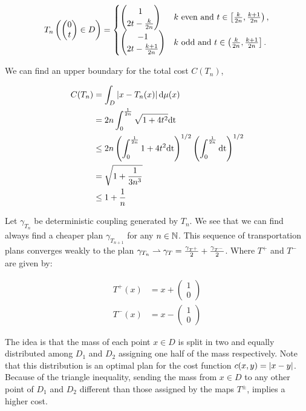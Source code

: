 \begin{equation*}
T_n\left( \begin{pmatrix}0\\t\end{pmatrix}\in D \right)=\begin{cases}
\begin{pmatrix}1\\  2t - \frac{k}{2n}\end{pmatrix} & k \text{ even } \mathrm{and} \ t \in \left[\frac{k}{2n}, \frac{k+1}{2n}\right),  \\
\begin{pmatrix}-1 \\  2t- \frac{k+1}{2n}\end{pmatrix} &  k \text{ odd } \mathrm{and} \ t \in \left(\frac{k}{2n}, \frac{k+1}{2n}\right].
\end{cases}
\end{equation*}

We can find an upper boundary for the total cost $C(T_n)$,

\begin{align*}
C(T_n)&=\int_{D}\left| x-T_n(x) \right| \mathrm{d}\mu(x)\\&=2n\int_{0}^{\frac{1}{2n}}\sqrt{1+4t^2} \mathrm{dt}\\ &\leq 2n\left( \int_{0}^{\frac{1}{2n}}1+4t^2\mathrm{dt} \right)^{1/2}\left( \int_{0}^{\frac{1}{2n}}\mathrm{dt} \right)^{1/2}\\ &= \sqrt{1+\frac{1}{3n^3}}\\&\leq 1+\frac{1}{n}
\end{align*}

Let $\gamma_{T_n}$ be deterministic coupling generated by $T_n$. We see that we can find always find a cheaper plan $\gamma_{T_{n+1}}$ for any $n\in \mathbb{N}$. This sequence of transportation plans converges weakly to the plan $\gamma_{T_n}\rightharpoonup \gamma_{T}=\frac{\gamma_{T^+}}{2}	+ \frac{\gamma_{T^-}}{2}$. Where $T^{+}$ and $T^{-}$ are given by:

\begin{align*}
T^{+}(x)&=x+\begin{pmatrix} 1 \\ 0\end{pmatrix}\\
T^{-}(x)&=x-\begin{pmatrix} 1 \\ 0\end{pmatrix}
\end{align*} 


The idea is that the mass of each point $x\in D$ is split in two and equally distributed among $D_1$ and $D_2$ assigning one half of the mass respectively. Note that this distribution is an optimal plan for the cost function $c(x,y)=\left| x-y \right|$. Because of the triangle inequality, sending the mass from $x\in D$ to any other point of $D_1$ and $D_2$ different than those assigned by the maps $T^{\pm}$, implies a higher cost.



